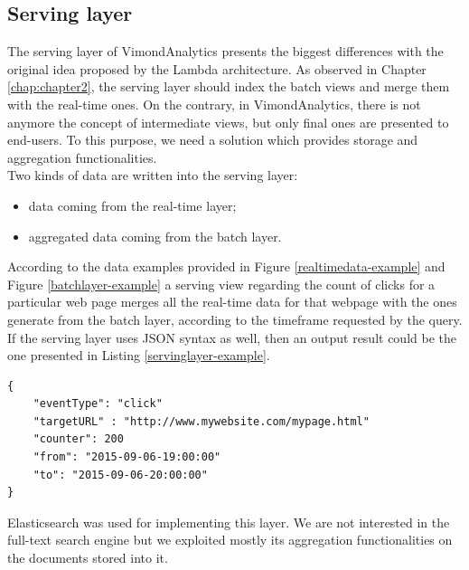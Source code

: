 \subsection{Serving layer}
The serving layer of VimondAnalytics presents the biggest differences with the original idea proposed by the Lambda architecture. As observed in Chapter \ref{chap:chapter2}, the serving layer should index the batch views and merge them with the real-time ones. On the contrary, in VimondAnalytics, there is not anymore the concept of intermediate views, but only final ones are presented to end-users. To this purpose, we need a solution which provides storage and aggregation functionalities.\\
Two kinds of data are written into the serving layer:
\begin{itemize}
\item data coming from the real-time layer;
\item aggregated data coming from the batch layer.
\end{itemize}
According to the data examples provided in Figure \ref{realtimedata-example} and Figure  \ref{batchlayer-example} a serving view regarding the count of clicks for a particular web page merges all the real-time data for that webpage with the ones generate from the batch layer, according to the timeframe requested by the query. If the serving layer uses JSON syntax as well, then an output result could be the one presented in Listing \ref{servinglayer-example}.
\begin{listing}
\begin{verbatim}
{     
    "eventType": "click"
    "targetURL" : "http://www.mywebsite.com/mypage.html"
    "counter": 200
    "from": "2015-09-06-19:00:00"
    "to": "2015-09-06-20:00:00"
}
\end{verbatim}
\caption{Serving Layer data example} 
\label{servinglayer-example}
\end{listing}
Elasticsearch was used for implementing this layer. We are not interested in the full-text search engine but we exploited mostly its aggregation functionalities on the documents stored into it. 
